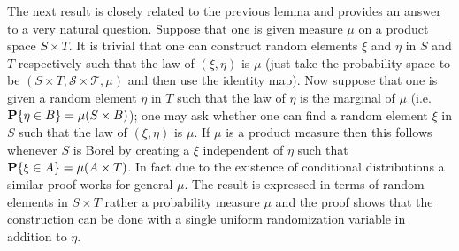 The next result is closely related to the previous lemma and provides
an answer to a very natural question.  Suppose that one is given
measure $\mu$ on a product space $S \times T$.  It is trivial that one can
construct random elements $\xi$ and $\eta$ in $S$ and $T$ respectively
such that the law of $(\xi, \eta)$ is $\mu$ (just take the probability
space to be $(S \times T, \mathcal{S} \times \mathcal{T}, \mu)$ and
then use the identity map).  Now suppose that one is given a random
element $\eta$ in $T$ such that the law of $\eta$ is the marginal of
$\mu$ (i.e. $\textbf{P}\{\eta \in B\} = \mu(S \times B)$); one may ask
whether one can find a random element $\xi$ in $S$ such that the law
of $(\xi, \eta)$ is $\mu$.  If $\mu$ is a product measure then this
follows whenever $S$ is Borel by creating a $\xi$ independent of
$\eta$ such that $\textbf{P}\{\xi \in A\} = \mu(A \times T)$.   In
fact due to the existence of conditional distributions a similar proof
works for general $\mu$.
The result is expressed in terms of random elements in $S \times T$
rather a probability measure $\mu$ and the proof shows that the
construction can be done with a single uniform randomization variable
in addition to $\eta$.


